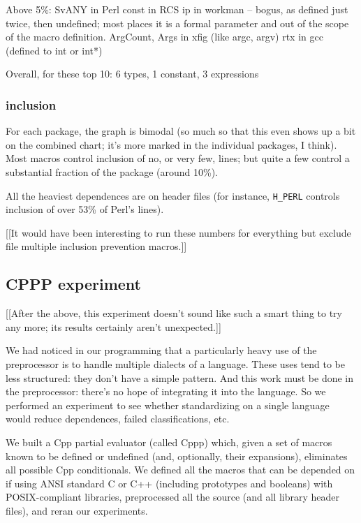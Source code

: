 \documentclass[10pt]{article}
\begin{document}
        Above 5\%: 
          SvANY in Perl
          const in RCS
          ip in workman -- bogus, as defined just twice, then undefined;
                  most places it is a formal parameter and out of the scope
                  of the macro definition.
          ArgCount, Args in xfig (like argc, argv)
          rtx in gcc (defined to int or int*)

        Overall, for these top 10:  6 types, 1 constant, 3 expressions

   \subsubsection{inclusion}

        For each package, the graph is bimodal (so much so that this even
          shows up a bit on the combined chart; it's more marked in the
          individual packages, I think).  Most macros control inclusion of
          no, or very few, lines; but quite a few control a substantial
          fraction of the package (around 10\%).

        All the heaviest dependences are on header files (for instance,
          \verb|H_PERL| controls inclusion of over 53\% of Perl's lines).

        [[It would have been interesting to run these numbers for everything
          but exclude file multiple inclusion prevention macros.]]


\subsection{CPPP experiment}

    [[After the above, this experiment doesn't sound like such a smart thing
      to try any more; its results certainly aren't unexpected.]]

    We had noticed in our programming that a particularly heavy use of the
      preprocessor is to handle multiple dialects of a language.  These uses
      tend to be less structured:  they don't have a simple pattern.  And
      this work must be done in the preprocessor:  there's no hope of
      integrating it into the language.  So we performed an experiment to
      see whether standardizing on a single language would reduce
      dependences, failed classifications, etc.

    We built a Cpp partial evaluator (called Cppp) which, given a set of
      macros known to be defined or undefined (and, optionally, their
      expansions), eliminates all possible Cpp conditionals.  We defined
      all the macros that can be depended on if using ANSI standard C or
      C++ (including prototypes and booleans) with POSIX-compliant
      libraries, preprocessed all the source (and 
      all library header files), and reran our experiments.
\end{document}
